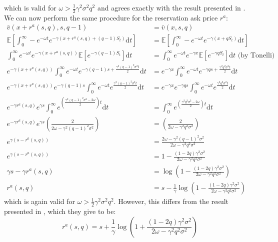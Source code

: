 which is valid for $\omega>\frac{1}{2}\gamma^2\sigma^2q^2$ and agrees exactly with
the result presented in \cite{AS2008}. We can now perform the same procedure for the
reservation ask price $r^a$:
\begin{align*}
    \bar{v}(x+r^a(s,q),s,q-1)&=\bar{v}(x,s,q)\\
    \mathbb{E}\left[\int_{0}^{\infty}-e^{-\omega t}e^{-\gamma(x+r^a(s,q)+(q-1)S_t)}\mathrm dt\right]&=\mathbb{E}\left[\int_{0}^{\infty}-e^{-\omega t}e^{-\gamma(x+qS_t)}\mathrm dt\right]\\
    \int_{0}^{\infty}e^{-\omega t}e^{-\gamma(x+r^a(s,q))}\mathbb{E}\left[e^{-\gamma(q-1)S_t}\right]\mathrm dt&=\int_{0}^{\infty}e^{-\omega t}e^{-\gamma x}\mathbb{E}\left[e^{-\gamma qS_t}\right]\mathrm dt\textrm{ (by Tonelli)}\\
    e^{-\gamma(x+r^a(s,q))}\int_{0}^{\infty}e^{-\omega t}e^{-\gamma(q-1)s+\frac{\gamma^2(q-1)^2\sigma^2t}{2}}\mathrm dt&=e^{-\gamma x}\int_{0}^{\infty}e^{-\omega t}e^{-\gamma qs+\frac{\gamma^2q^2\sigma^2t}{2}}\mathrm dt\\
    e^{-\gamma(x+r^a(s,q))}e^{-\gamma(q-1)s}\int_{0}^{\infty}e^{-\omega t}e^{\frac{\gamma^2(q-1)^2\sigma^2t}{2}}\mathrm dt&=e^{-\gamma x}e^{-\gamma qs}\int_{0}^{\infty}e^{-\omega t}e^{\frac{\gamma^2q^2\sigma^2t}{2}}\mathrm dt\\
    e^{-\gamma r^a(s,q)}e^{\gamma s}\int_{0}^{\infty}e^{\left(\frac{\gamma^2(q-1)^2\sigma^2-2\omega}{2}\right)t}\mathrm dt&=\int_{0}^{\infty}e^{\left(\frac{\gamma^2q^2\sigma^2-2\omega}{2}\right)t}\mathrm dt\\
    e^{-\gamma r^a(s,q)}e^{\gamma s}\left(\frac{2}{2\omega-\gamma^2(q-1)^2\sigma^2}\right)&=\left(\frac{2}{2\omega-\gamma^2q^2\sigma^2}\right)\\
    e^{\gamma(s-r^a(s,q))}&=\frac{2\omega-\gamma^2(q-1)^2\sigma^2}{2\omega-\gamma^2q^2\sigma^2}\\
    e^{\gamma(s-r^a(s,q))}&=1-\frac{(1-2q)\gamma^2\sigma^2}{2\omega-\gamma^2q^2\sigma^2}\\
    \gamma s - \gamma r^a(s,q)&=\log\left(1-\frac{(1-2q)\gamma^2\sigma^2}{2\omega-\gamma^2q^2\sigma^2}\right)\\
    r^a(s,q) &= s-\frac{1}{\gamma}\log\left(1-\frac{(1-2q)\gamma^2\sigma^2}{2\omega-\gamma^2q^2\sigma^2}\right)
\end{align*}
which is again valid for $\omega>\frac{1}{2}\gamma^2\sigma^2q^2$. However, this differs
from the result presented in \cite{AS2008}, which they give to be:
\begin{equation*}
    r^a(s,q)=s+\frac{1}{\gamma}\log\left(1+\frac{(1-2q)\gamma^2\sigma^2}{2\omega-\gamma^2q^2\sigma^2}\right)
\end{equation*}
